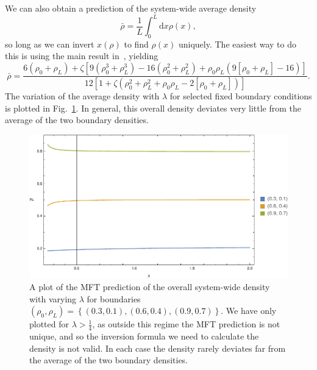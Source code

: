 We can also obtain a prediction of the system-wide average density
\begin{equation}
 \bar{\rho} = \frac{1}{L} \int_0^L  \! \! \mathrm{d}x \rho(x),
\end{equation}
so long as we can invert $x(\rho)$ to find $\rho(x)$ uniquely. The easiest way to do this is using the main result in~\cite{laisant1905}, yielding
\begin{equation}
 \bar{\rho} = \frac{6 (\rho_0 + \rho_L) + \zeta \left[9 \left( \rho_0^3 + \rho_L^3\right) - 16 \left( \rho_0^2 + \rho_L^2 \right) + \rho_0\rho_L\left( 9\left[ \rho_0 + \rho_L \right] - 16  \right)  \right]}{12 \left[ 1 + 
  \zeta \left( \rho_0^2 + \rho_L^2 + \rho_0 \rho_L - 2 \left[ \rho_0+\rho_L \right] \right) \right]}.
\end{equation}
The variation of the average density with $\lambda$ for selected fixed boundary conditions is plotted in Fig.~\ref{fig:mftDens}. In general, this overall density deviates very little from the average of the two boundary densities.
\begin{figure}[h!]
 \caption[The variation of the system-wide average density with respect to $\lambda$ in the MFT, with fixed boundary densities.]{\label{fig:mftDens} 
 A plot of the MFT prediction of the overall system-wide density with varying $\lambda$ for boundaries $(\rho_0, \rho_L) = \left\lbrace (0.3, 0.1), (0.6, 0.4), (0.9, 0.7) \right\rbrace$.
 We have only plotted for $\lambda>\frac{1}{4}$, as outside this regime the MFT prediction is not unique, and so the inversion formula we need to calculate the density is not valid. In each case the density rarely deviates far from
 the average of the two boundary densities.}
 \includegraphics[width=0.99\linewidth]{analytics/images/mftDensity1d}
\end{figure}

